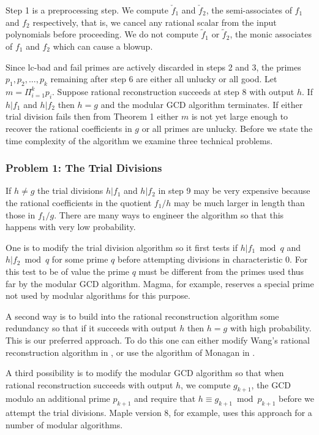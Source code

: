 \documentclass[10pt]{article}
\begin{document}
\medskip
\noindent
Step 1 is a preprocessing step.  We compute $\check{f}_1$ and $\check{f}_2$,
the semi-associates of $f_1$ and $f_2$ respectively, that is,
we cancel any rational scalar from the input polynomials before proceeding.
We do not compute $\tilde{f}_1$ or $\tilde{f}_2$, the monic
associates of $f_1$ and $f_2$ which can cause a blowup.

Since lc-bad and fail primes are actively discarded in steps 2 and 3,
the primes $p_1, p_2, ..., p_k$ remaining after step 6 are
either all unlucky or all good.  Let $m = \Pi_{i=1}^k p_i$.
Suppose rational reconstruction succeeds at step 8 with output $h.$
If $h|f_1$ and $h|f_2$ then $h = g$ and the modular GCD algorithm terminates.
If either trial division fails then from Theorem 1
either $m$ is not yet large enough to recover the rational
coefficients in $g$ or all primes are unlucky.
Before we state the time complexity of the algorithm
we examine three technical problems.

\subsubsection*{Problem 1: The Trial Divisions}
If $h \ne g$ the trial divisions $h|f_1$ and $h|f_2$ in step 9 may
be very expensive because the rational coefficients in the quotient
$f_1/h$ may be much larger in length than those in $f_1/g$.
There are many ways to engineer the algorithm so that this
happens with very low probability.

One is to modify the trial division algorithm so it first
tests if $h|f_1 \bmod q$ and $h|f_2 \bmod q$ for some prime $q$ before
attempting divisions in characteristic 0.  For this test to be of value
the prime $q$ must be different from the primes used thus far
by the modular GCD algorithm.  Magma, for example, reserves
a special prime not used by modular algorithms for this purpose.

A second way is to build into the rational reconstruction algorithm
some redundancy so that if it succeeds with output $h$ then $h = g$
with high probability. This is our preferred approach.  To do this
one can either modify Wang's rational reconstruction algorithm in
\cite{Wang81,Wang}, or use the algorithm of Monagan in \cite{MQRR}.

A third possibility is to modify the modular GCD algorithm
so that when rational reconstruction succeeds with output $h$,
we compute $g_{k+1}$, the GCD modulo an additional prime $p_{k+1}$
and require that $h \equiv g_{k+1} \bmod p_{k+1}$ before we
attempt the trial divisions.  Maple version 8, for example,
uses this approach for a number of modular algorithms.
\end{document}
